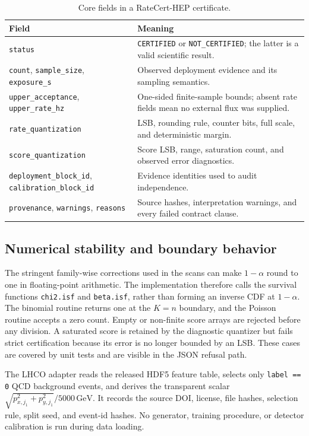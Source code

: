\documentclass[preprint,12pt]{elsarticle}
\begin{document}
\begin{table}[t]
\centering\small
\caption{Core fields in a RateCert-HEP certificate.}
\label{tab:schema}
\begin{tabular}{p{}p{}}
\toprule
Field & Meaning \\
\midrule
\texttt{status} & \texttt{CERTIFIED} or \texttt{NOT\_CERTIFIED}; the latter is a valid scientific result. \\
\texttt{count}, \texttt{sample\_size}, \texttt{exposure\_s} & Observed deployment evidence and its sampling semantics. \\
\texttt{upper\_acceptance}, \texttt{upper\_rate\_hz} & One-sided finite-sample bounds; absent rate fields mean no external flux was supplied. \\
\texttt{rate\_quantization} & LSB, rounding rule, counter bits, full scale, and deterministic margin. \\
\texttt{score\_quantization} & Score LSB, range, saturation count, and observed error diagnostics. \\
\texttt{deployment\_block\_id}, \texttt{calibration\_}\allowbreak\texttt{block\_id} & Evidence identities used to audit independence. \\
\texttt{provenance}, \texttt{warnings}, \texttt{reasons} & Source hashes, interpretation warnings, and every failed contract clause. \\
\bottomrule
\end{tabular}
\end{table}

\subsection{Numerical stability and boundary behavior}

The stringent family-wise corrections used in the scans can make $1-\alpha$
round to one in floating-point arithmetic.  The implementation therefore calls
the survival functions \texttt{chi2.isf} and \texttt{beta.isf}, rather than
forming an inverse CDF at $1-\alpha$.  The binomial routine returns one at the
$K=n$ boundary, and the Poisson routine accepts a zero count.  Empty or
non-finite score arrays are rejected before any division.  A saturated score is
retained by the diagnostic quantizer but fails strict certification because its
error is no longer bounded by an LSB.  These cases are covered by unit tests and
are visible in the JSON refusal path.

The LHCO adapter reads the released HDF5 feature table, selects only
\verb|label == 0| QCD background events, and derives the transparent scalar
$\sqrt{p_{x,j_1}^2+p_{y,j_1}^2}/5000\,\mathrm{GeV}$.  It records the source
DOI, license, file hashes, selection rule, split seed, and event-id hashes.
No generator, training procedure, or detector calibration is run during data
loading.
\end{document}
